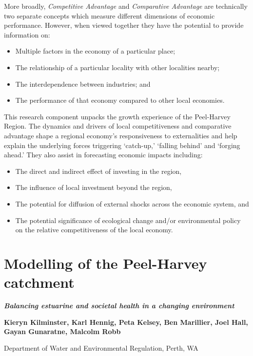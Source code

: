 \documentclass[
]{book}
\begin{document}
More broadly, \emph{Competitive Advantage} and \emph{Comparative Advantage} are technically two separate concepts which measure different dimensions of economic performance. However, when viewed together they have the potential to provide information on:

\begin{itemize}
\item
  Multiple factors in the economy of a particular place;
\item
  The relationship of a particular locality with other localities nearby;~
\item
  The interdependence between industries; and~
\item
  The performance of that economy compared to other local economies.~
\end{itemize}

This research component unpacks the growth experience of the Peel-Harvey Region. The dynamics and drivers of local competitiveness and comparative advantage shape a regional economy's responsiveness to externalities and help explain the underlying forces triggering `catch-up,' `falling behind' and `forging ahead.' They also assist in forecasting economic impacts including:

\begin{itemize}
\item
  The direct and indirect effect of investing in the region,~
\item
  The influence of local investment beyond the region,~
\item
  The potential for diffusion of external shocks across the economic system, and
\item
  The potential significance of ecological change and/or environmental policy on the relative competitiveness of the local economy.
\end{itemize}

\hypertarget{modelling-of-the-peel-harvey-catchment}{%
\chapter{Modelling of the Peel-Harvey catchment}\label{modelling-of-the-peel-harvey-catchment}}

{\textbf{\emph{Balancing estuarine and societal health in a changing environment}}}

{\textbf{Kieryn Kilminster, Karl Hennig, Peta Kelsey, Ben Marillier, Joel Hall, Gayan Gunaratne, Malcolm Robb}}

{Department of Water and Environmental Regulation, Perth, WA}
\end{document}
